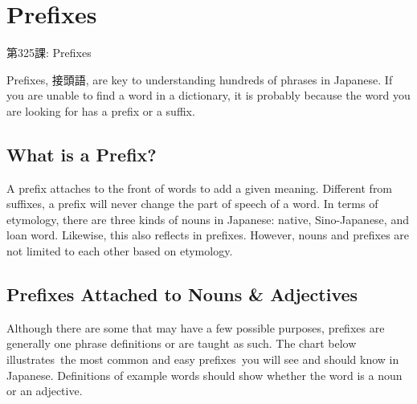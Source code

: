     
\chapter{Prefixes}

\begin{center}
\begin{Large}
第325課: Prefixes 
\end{Large}
\end{center}
 
\par{ Prefixes, 接頭語, are key to understanding hundreds of phrases in Japanese. If you are unable to find a word in a dictionary, it is probably because the word you are looking for has a prefix or a suffix. }
      
\section{What is a Prefix?}
 A prefix attaches to the front of words to add a given meaning. Different from suffixes, a prefix will never change the part of speech of a word. In terms of etymology, there are three kinds of nouns in Japanese: native, Sino-Japanese, and loan word. Likewise, this also reflects in prefixes. However, nouns and prefixes are not limited to each other based on etymology.       
\section{Prefixes Attached to Nouns \& Adjectives}
 
\par{ Although there are some that may have a few possible purposes, prefixes are generally one phrase definitions or are taught as such. The chart below illustrates the most common and easy prefixes you will see and should know in Japanese. Definitions of example words should show whether the word is a noun or an adjective. }

